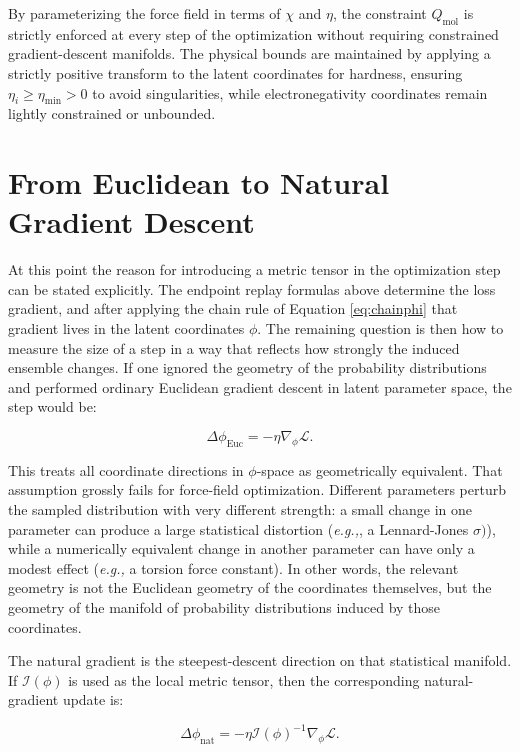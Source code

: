 By parameterizing the force field in terms of $\chi$ and $\eta$, the constraint $Q_{\mathrm{mol}}$ is strictly enforced at every step of the optimization without requiring constrained gradient-descent manifolds. The physical bounds are maintained by applying a strictly positive transform to the latent coordinates for hardness, ensuring $\eta_i \ge \eta_{\min} > 0$ to avoid singularities, while electronegativity coordinates remain lightly constrained or unbounded.

\section{From Euclidean to Natural Gradient Descent}

At this point the reason for introducing a metric tensor in the optimization step can be stated explicitly. The endpoint replay formulas above determine the loss gradient, and after applying the chain rule of Equation \eqref{eq:chainphi} that gradient lives in the latent coordinates $\phi$. The remaining question is then how to measure the size of a step in a way that reflects how strongly the induced ensemble changes. If one ignored the geometry of the probability distributions and performed ordinary Euclidean gradient descent in latent parameter space, the step would be:

\begin{equation}
    \Delta \phi_{\mathrm{Euc}}
    =
    -
    \eta
    \nabla_\phi \mathcal{L}.
    \label{eq:eucstep}
\end{equation}

This treats all coordinate directions in $\phi$-space as geometrically equivalent. That assumption grossly fails for force-field optimization. Different parameters perturb the sampled distribution with very different strength: a small change in one parameter can produce a large statistical distortion (\textit{e.g.,}, a Lennard-Jones $\sigma)$), while a numerically equivalent change in another parameter can have only a modest effect (\textit{e.g.,} a torsion force constant). In other words, the relevant geometry is not the Euclidean geometry of the coordinates themselves, but the geometry of the manifold of probability distributions induced by those coordinates.

The natural gradient is the steepest-descent direction on that statistical manifold. If $\mathcal{I}(\phi)$ is used as the local metric tensor, then the corresponding natural-gradient update is:

\begin{equation}
    \Delta \phi_{\mathrm{nat}}
    =
    -
    \eta
    \mathcal{I}(\phi)^{-1}
    \nabla_\phi \mathcal{L}.
    \label{eq:natstep}
\end{equation}

